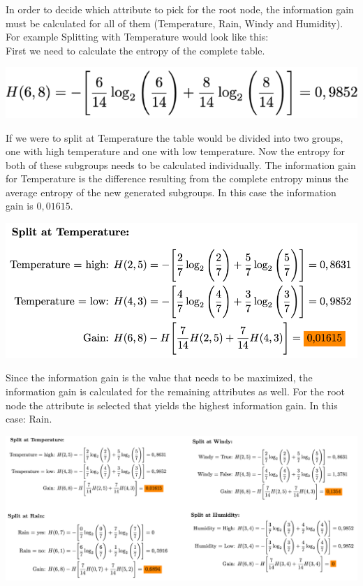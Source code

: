 \documentclass[
12pt,
headsepline,
bibliography=totoc,
twoside=semi,
fleqn
]{scrartcl}
\begin{document}
      In order to decide which attribute to pick for the root node, the information gain must be calculated for all of them (Temperature, Rain, Windy and Humidity). For example Splitting with Temperature would look like this: \\

      First we need to calculate the entropy of the complete table. 

      \begin{center}\includegraphics[scale=0.7]{BDT8.png}\label{fig:fig8}\end{center}

      If we were to split at Temperature the table would be divided into two groups, one with high temperature and one with low temperature. Now the entropy for both of these subgroups needs to be calculated individually. The information gain for Temperature is the difference resulting from the complete entropy minus the average entropy of the new generated subgroups. In this case the information gain is $0,01615$. 

      \begin{center}\includegraphics[scale=0.7]{BDT7.png}\label{fig:fig7}\end{center}

      Since the information gain is the value that needs to be maximized, the information gain is calculated for the remaining attributes as well. For the root node the attribute is selected that yields the highest information gain. In this case: Rain. 

      \begin{center}\includegraphics[scale=0.7]{BDT9.png}\label{fig:fig9}\end{center}
\end{document}
